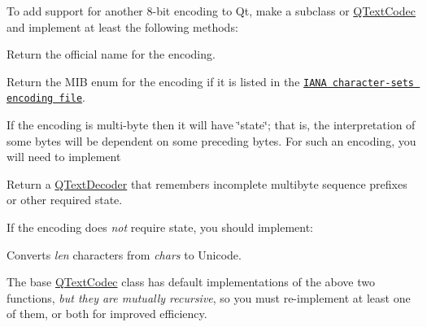 To add support for another 8-\/bit encoding to Qt, make a subclass or \hyperlink{class_q_text_codec}{Q\+Text\+Codec} and implement at least the following methods\+: 
\begin{DoxyDescription}
\item[{\ttfamily const} char$\ast$ \hyperlink{class_q_text_codec_ab4e991cacb9c6acff167c4f8d4f2ec3e}{name() const} ]Return the official name for the encoding. 
\item[{\ttfamily int} \hyperlink{class_q_text_codec_a237e62722c97fb1fba989d746142ec1f}{mib\+Enum() const} ]Return the M\+I\+B enum for the encoding if it is listed in the \href{ftp://ftp.isi.edu/in-notes/iana/assignments/character-sets}{\tt I\+A\+N\+A character-\/sets encoding file}. 
\end{DoxyDescription}If the encoding is multi-\/byte then it will have \char`\"{}state\char`\"{}; that is, the interpretation of some bytes will be dependent on some preceding bytes. For such an encoding, you will need to implement 
\begin{DoxyDescription}
\item[{\ttfamily Q\+Text\+Decoder$\ast$} \hyperlink{class_q_text_codec_a093251759df51159cd3c01f45aeffaac}{make\+Decoder() const} ]Return a \hyperlink{class_q_text_decoder}{Q\+Text\+Decoder} that remembers incomplete multibyte sequence prefixes or other required state. 
\end{DoxyDescription}If the encoding does {\itshape not} require state, you should implement\+: 
\begin{DoxyDescription}
\item[{\ttfamily \hyperlink{class_q_string}{Q\+String}} \hyperlink{class_q_text_codec_a11752c64a75df331b762788ced77ab28}{to\+Unicode(const char$\ast$ chars, int len) const} ]Converts {\itshape len} characters from {\itshape chars} to Unicode. 
\end{DoxyDescription}The base \hyperlink{class_q_text_codec}{Q\+Text\+Codec} class has default implementations of the above two functions, {\itshape but they are mutually recursive}, so you must re-\/implement at least one of them, or both for improved efficiency.

